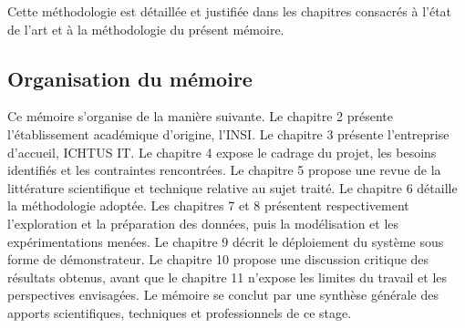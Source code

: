 Cette méthodologie est détaillée et justifiée dans les chapitres consacrés à l'état de l'art et à la
méthodologie du présent mémoire.

\subsection{Organisation du mémoire}

Ce mémoire s'organise de la manière suivante. Le chapitre 2 présente l'établissement académique
d'origine, l'INSI. Le chapitre 3 présente l'entreprise d'accueil, ICHTUS IT. Le chapitre 4 expose le
cadrage du projet, les besoins identifiés et les contraintes rencontrées. Le chapitre 5 propose une revue
de la littérature scientifique et technique relative au sujet traité. Le chapitre 6 détaille la méthodologie
adoptée. Les chapitres 7 et 8 présentent respectivement l'exploration et la préparation des données, puis
la modélisation et les expérimentations menées. Le chapitre 9 décrit le déploiement du système sous forme
de démonstrateur. Le chapitre 10 propose une discussion critique des résultats obtenus, avant que le
chapitre 11 n'expose les limites du travail et les perspectives envisagées. Le mémoire se conclut par une
synthèse générale des apports scientifiques, techniques et professionnels de ce stage.
